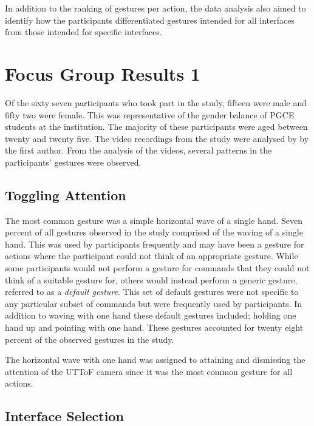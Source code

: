 \documentclass[manuscript, review, screen]{acmart}
\begin{document}
In addition to the ranking of gestures per action, the data analysis also aimed to identify how the participants differentiated gestures intended for all interfaces from those intended for specific interfaces.


\section{Focus Group Results 1}
\label{sec:focusgroupresults1}  



Of the sixty seven participants who took part in the study, fifteen were male and fifty two were female.
This was representative of the gender balance of \ac{PGCE} students at the institution.
The majority of these participants were aged between twenty and twenty five.
The video recordings from the study were analysed by by the first author.
From the analysis of the videos, several patterns in the participants' gestures were observed.

\subsection{Toggling Attention}

The most common gesture was a simple horizontal wave of a single hand.
Seven percent of all gestures observed in the study comprised of the waving of a single hand.
This was used by participants frequently and may have been a gesture for actions where the participant could not think of an appropriate gesture. 
While some participants would not perform a gesture for commands that they could not think of a suitable gesture for, others would instead perform a generic gesture, referred to as a \textit{default gesture}.
This set of default gestures were not specific to any particular subset of commands but were frequently used by participants.
In addition to waving with one hand these default gestures included; holding one hand up and pointing with one hand.
These gestures accounted for twenty eight percent of the observed gestures in the study.

The horizontal wave with one hand was assigned to attaining and dismissing the attention of the \ac{UTToF} camera since it was the most common gesture for all actions.

\subsection{Interface Selection}
\end{document}
